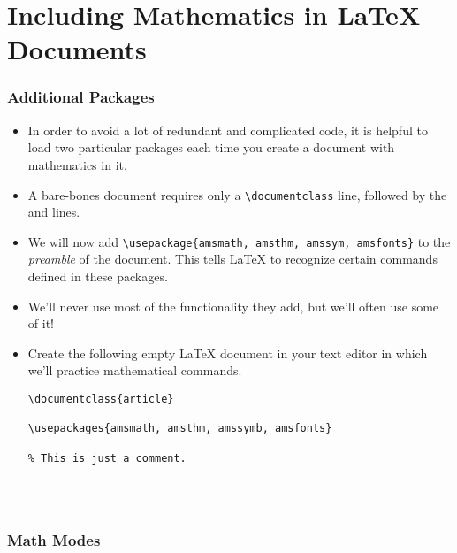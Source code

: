\part{Including Mathematics in \LaTeX{} Documents}

\section{Additional Packages}

\begin{itemize}

\item In order to avoid a lot of redundant and complicated code, it is
  helpful to load two particular packages each time you create a
  document with mathematics in it.

\item A bare-bones document requires only a \verb=\documentclass= line, followed
  by the \verb== and \verb== lines.

\item We will now add \verb=\usepackage{amsmath, amsthm, amssym, amsfonts}= to
  the \textit{preamble} of the document. This tells \LaTeX{} to recognize
  certain commands defined in these packages.

\item We'll never use most of the functionality they add, but we'll
  often use some of it!

\item Create the following empty \LaTeX{} document in your text editor in which
  we'll practice mathematical commands.

\begin{center}
  \begin{minipage}{.8\linewidth}
    \begin{framed}
\begin{verbatim}
\documentclass{article}

\usepackages{amsmath, amsthm, amssymb, amsfonts}

% This is just a comment.




\end{verbatim}
    \end{framed}
  \end{minipage}
\end{center}

\end{itemize}

\section{Math Modes}

